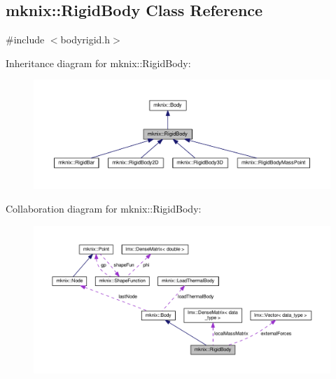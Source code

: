\hypertarget{classmknix_1_1_rigid_body}{}\subsection{mknix\+:\+:Rigid\+Body Class Reference}
\label{classmknix_1_1_rigid_body}


{\ttfamily \#include $<$bodyrigid.\+h$>$}



Inheritance diagram for mknix\+:\+:Rigid\+Body\+:\nopagebreak
\begin{figure}[H]
\begin{center}
\leavevmode
\includegraphics[width=350pt]{de/d58/classmknix_1_1_rigid_body__inherit__graph}
\end{center}
\end{figure}


Collaboration diagram for mknix\+:\+:Rigid\+Body\+:\nopagebreak
\begin{figure}[H]
\begin{center}
\leavevmode
\includegraphics[width=350pt]{da/d0d/classmknix_1_1_rigid_body__coll__graph}
\end{center}
\end{figure}
